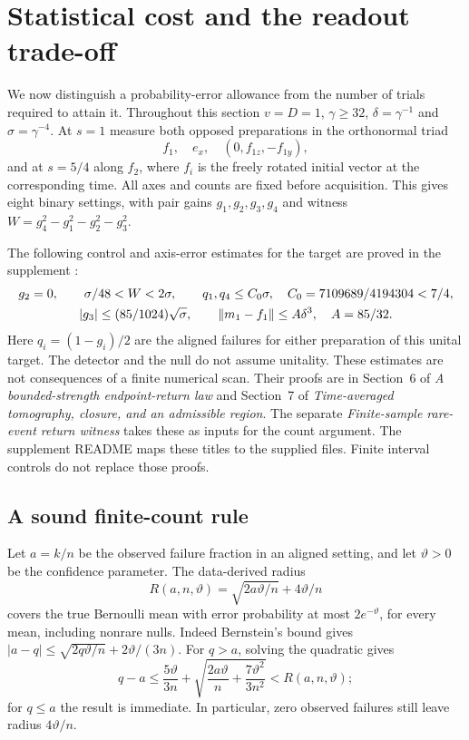 \section{Statistical cost and the readout trade-off}
\label{sec:measurement-cost}
We now distinguish a probability-error allowance from the number of trials
required to attain it. Throughout this section $v=D=1$, $\gamma\geq32$,
$\delta=\gamma^{-1}$ and $\sigma=\gamma^{-4}$. At $s=1$ measure both
opposed preparations in the orthonormal triad
\[
 f_1,\quad e_x,\quad (0,f_{1z},-f_{1y}),
\]
and at $s=5/4$ along $f_2$, where $f_i$ is the freely rotated initial
vector at the corresponding time. All axes and counts are fixed before
acquisition. This gives eight binary settings, with pair gains
$g_1,g_2,g_3,g_4$ and witness
$W=g_4^2-g_1^2-g_2^2-g_3^2$.

The following control and axis-error estimates for the target are proved
in the supplement \cite{Internal}:
\begin{gather}
 g_2=0,\qquad \sigma/48<W<2\sigma,\qquad
 q_1,q_4\leq C_0\sigma,\quad C_0=7109689/4194304<7/4,\label{eq:target-bounds}\\
 |g_3|\leq(85/1024)\sqrt\sigma,\qquad
 \left\lVert m_1-f_1\right\rVert\leq A\delta^3,\quad A=85/32.
\end{gather}
Here $q_i=(1-g_i)/2$ are the aligned failures for either preparation of
this unital target. The detector and the null do not assume unitality.
These estimates are not consequences of a finite numerical scan.
Their proofs are in Section~6 of \emph{A bounded-strength endpoint-return
law} and Section~7 of \emph{Time-averaged tomography, closure, and an
admissible region}. The separate \emph{Finite-sample rare-event return
witness} takes these as inputs for the count argument. The supplement
README maps these titles to the supplied files.
Finite interval controls do not replace those proofs.

\subsection{A sound finite-count rule}
Let $a=k/n$ be the observed failure fraction in an aligned setting, and
let $\vartheta>0$ be the confidence parameter. The data-derived radius
\[
 R(a,n,\vartheta)=\sqrt{2a\vartheta/n}+4\vartheta/n
\]
covers the true Bernoulli mean with error probability at most
$2e^{-\vartheta}$, for every mean, including nonrare nulls. Indeed Bernstein's
bound gives $|a-q|\leq\sqrt{2q\vartheta/n}+2\vartheta/(3n)$.
For $q>a$, solving the quadratic gives
\[
 q-a\leq\frac{5\vartheta}{3n}
       +\sqrt{\frac{2a\vartheta}{n}+\frac{7\vartheta^2}{3n^2}}
       <R(a,n,\vartheta);
\]
for $q\leq a$ the result is immediate. In particular, zero observed
failures still leave radius $4\vartheta/n$.

